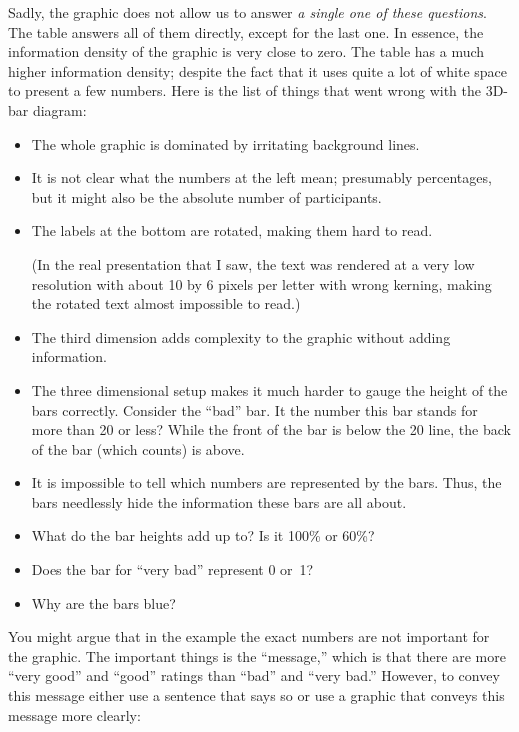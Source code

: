 Sadly, the graphic does not allow us to answer \emph{a single one of these
  questions}. The table answers all of them directly, except for the last
one. In essence, the information density of the graphic is very
close to zero. The table has a much higher information density; despite
the fact that it uses quite a lot of white space to present a few numbers.
Here is the list of things that went wrong with the 3D-bar diagram:
\begin{itemize}
\item
  The whole graphic is dominated by irritating background lines.
\item
  It is not clear what the numbers at the left mean; presumably
  percentages, but it might also be the absolute number of
  participants.
\item
  The labels at the bottom are rotated, making them hard to read.

  (In the real presentation that I saw, the text was rendered at a very
  low resolution with about 10 by 6 pixels per letter with wrong
  kerning, making the rotated text almost impossible to read.)
\item
  The third dimension adds complexity to the graphic without adding
  information.
\item
  The three dimensional setup makes it much harder to gauge the height
  of the bars correctly. Consider the ``bad'' bar. It the number this
  bar stands for more than 20 or less? While the front of the bar is
  below the 20 line, the back of the bar (which counts) is above.
\item
  It is impossible to tell which  numbers are represented by the
  bars. Thus, the bars needlessly hide the information these bars are
  all about.
\item
  What do the bar heights add up to? Is it 100\% or 60\%?
\item
  Does the bar for ``very bad'' represent 0 or~1?
\item
  Why are the bars blue?
\end{itemize}

You might argue that in the example the exact numbers are not
important for the graphic. The important things is the ``message,''
which is that there are more ``very good'' and ``good'' ratings than
``bad'' and ``very bad.'' However, to convey this message either use a
sentence that says so or use a graphic that conveys this message more
clearly:

